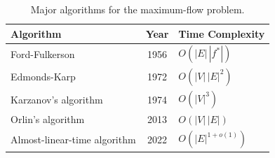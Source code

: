 \begin{table}[ht]
\centering
\renewcommand{\arraystretch}{1.25}
\setlength{\tabcolsep}{16pt}
\begin{tabular*}{0.9\textwidth}{@{\extracolsep{\fill}}lcl}
\hline
\textbf{Algorithm} & \textbf{Year} & \textbf{Time Complexity} \\ \hline
Ford-Fulkerson & 1956 & $O\!\left(|E|\,|f^*|\right)$ \\ \hline
Edmonds-Karp & 1972 & $O\!\left(|V|\,|E|^2\right)$ \\ \hline
Karzanov's algorithm & 1974 & $O\!\left(|V|^3\right)$ \\ \hline
Orlin's algorithm & 2013 & $O\!\left(|V|\,|E|\right)$ \\ \hline
Almost-linear-time algorithm & 2022 & $O(|E|^{1+o(1)})$ \\ \hline
\end{tabular*}
\caption{Major algorithms for the maximum-flow problem. }
\label{tab:maxflow-algorithms}
\end{table}
